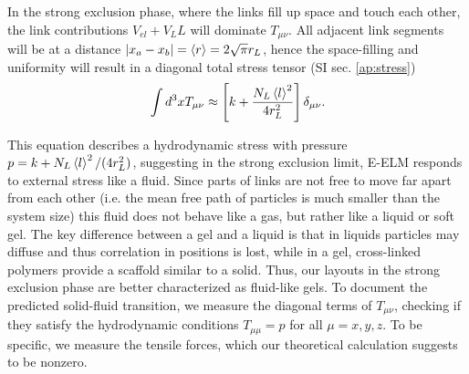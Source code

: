 \documentclass[nofootinbib,preprint,floatfix,titlepage,endfloats]{revtex4} %
\begin{document}
In the strong exclusion phase, where the links fill up space and touch each other,
the link contributions $V_{el}+V_LL$ will dominate $T_{\mu\nu}$. All adjacent link segments will be at a distance $|x_a-x_b| = \left<r\right> = 2\sqrt{\pi} r_L$,
  hence the space-filling and uniformity will result in a diagonal total stress tensor (SI sec. \ref{ap:stress}) %
\begin{equation}
    \mbox{}\int d^3x  T_{\mu\nu} \approx \left[ k + {N_L \left<l\right>^2\over 4r_L^2}   \right]\delta_{\mu\nu} \label{eq:Tstrong}
.\end{equation}

This equation describes a hydrodynamic stress with pressure $ p =  k + {N_L \left<l\right>^2/( 4r_L^2)}$, suggesting in the strong exclusion limit, E-ELM responds to external stress like a fluid. Since parts of links are not free to move far apart from each other (i.e. the mean free path of particles is much smaller than the system size) this fluid does not behave like a gas, but rather like a liquid or soft gel. The key difference between a gel and a liquid is that in liquids particles may diffuse and thus correlation in positions is lost, while in a gel, cross-linked polymers provide a scaffold similar to a solid. Thus, our layouts in the strong exclusion phase are better characterized as fluid-like gels.  
To document the predicted solid-fluid transition, we measure the diagonal terms of $T_{\mu\nu}$, checking if they satisfy the hydrodynamic conditions $T_{\mu\mu}=p$ for all $\mu=x,y,z$. 
To be specific, we measure the tensile forces, which our theoretical calculation suggests to be nonzero.  
\end{document}

